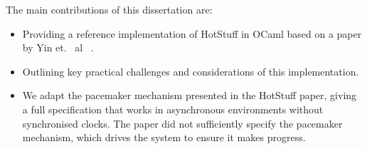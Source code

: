 The main contributions of this dissertation are:
\begin{itemize}
	\item Providing a reference implementation of HotStuff in OCaml based on a paper by Yin et. ~al~ \cite{yin2019hotstuff}.
	\item Outlining key practical challenges and considerations of this implementation.
	\item We adapt the pacemaker mechanism presented in the HotStuff paper, giving a full specification that works in asynchronous environments without synchronised clocks. The paper did not sufficiently specify the pacemaker mechanism, which drives the system to ensure it makes progress.
\end{itemize}





